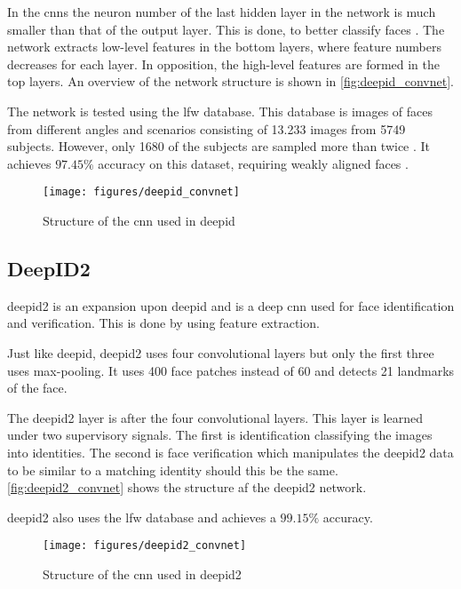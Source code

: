 In the \gls{cnn}s the neuron number of the last hidden layer in the network is much smaller than that of the output layer. This is done, to better classify faces \citep{deepID2014}. The network extracts low-level features in the bottom layers, where feature numbers decreases for each layer. In opposition, the high-level features are formed in the top layers. An overview of the network structure is shown in \autoref{fig:deepid_convnet}.

The network is tested using the \gls{lfw} database. This database is images of faces from different angles and scenarios consisting of 13.233 images from 5749 subjects. However, only 1680 of the subjects are sampled more than twice \citep{lfw2007}. It achieves $97.45\%$ accuracy on this dataset, requiring weakly aligned faces \citep{deepID2014}.

\begin{figure}[h]
	\centering
	\texttt{[image: figures/deepid\_convnet]}
	\caption{Structure of the \gls{cnn} used in \gls{deepid} \citep{deepID2014}}
	\label{fig:deepid_convnet}
\end{figure}

\subsection{DeepID2}
\gls{deepid2} is an expansion upon \gls{deepid} and is a deep \gls{cnn} used for face identification and verification. This is done by using feature extraction.

Just like \gls{deepid}, \gls{deepid2} uses four convolutional layers but only the first three uses max-pooling. It uses 400 face patches instead of 60 \citep{deepID2014,sun2014} and detects 21 landmarks of the face.

The \gls{deepid2} layer is after the four convolutional layers. This layer is learned under two supervisory signals. The first is identification classifying the images into identities. The second is face verification which manipulates the \gls{deepid2} data to be similar to a matching identity should this be the same. \autoref{fig:deepid2_convnet} shows the structure af the \gls{deepid2} network.

\gls{deepid2} also uses the \gls{lfw} database and achieves a $99.15\%$ accuracy.

\begin{figure}[h]
	\centering
	\texttt{[image: figures/deepid2\_convnet]}
	\caption{Structure of the \gls{cnn} used in \gls{deepid2} \citep{sun2014}}
	\label{fig:deepid2_convnet}
\end{figure}

